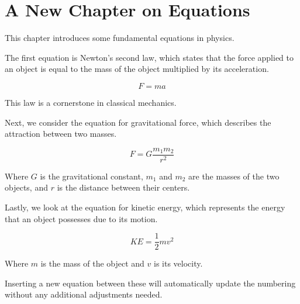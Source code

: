 \section{A New Chapter on Equations}

This chapter introduces some fundamental equations in physics.

The first equation is Newton's second law, which states that the force applied to an object is equal to the mass of the object multiplied by its acceleration.

\begin{equation}
F = ma
\label{eq:NewtonII} %
\end{equation}

This law is a cornerstone in classical mechanics.

Next, we consider the equation for gravitational force, which describes the attraction between two masses.

\begin{mdframed}    %
\begin{equation}
F = G \frac{m_1 m_2}{r^2}
\label{eq:gravity} %
\end{equation}
\end{mdframed}

Where $G$ is the gravitational constant, $m_1$ and $m_2$ are the masses of the two objects, and $r$ is the distance between their centers.

Lastly, we look at the equation for kinetic energy, which represents the energy that an object possesses due to its motion.

\begin{equation}
KE = \frac{1}{2} mv^2
\label{eq:kineticEnergy} %
\end{equation}

Where $m$ is the mass of the object and $v$ is its velocity.

Inserting a new equation between these will automatically update the numbering without any additional adjustments needed.